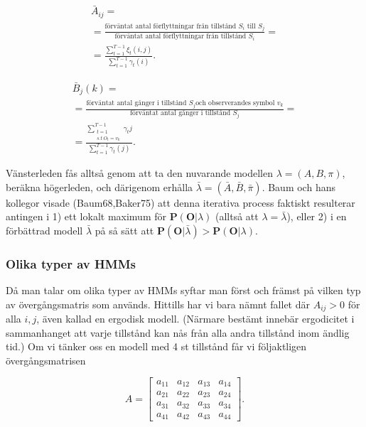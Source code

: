 \documentclass[../rapport_MVEX01-11-05]{subfiles}
\begin{document}
\begin{multline*}
\bar{A}_{ij} = \\ = \frac{\text{förväntat antal förflyttningar från
    tillstånd $S_i$ till $S_j$}}{\text{förväntat antal förflyttningar
    från tillstånd $S_i$}} = \\ =
\frac{\sum_{t=1}^{T-1}\xi_t(i,j)}{\sum_{t=1}^{T-1}\gamma_t(i)}.
\end{multline*}

\begin{multline*}
\bar{B}_j(k) = \\ = \frac{\text{förväntat antal gånger i tillstånd $S_j$
    och observerandes symbol $v_k$}}{\text{förväntat antal gånger i
    tillstånd $S_j$}} = \\ = \frac{\sum_{\substack{t=1\\s.t~ O_t =
      v_k}}^{T-1}\gamma_t{j}}{\sum_{t=1}^{T-1}\gamma_t(j)}.
\end{multline*}

Vänsterleden fås alltså genom att ta den nuvarande modellen $\lambda =
(A,B,\pi)$, beräkna högerleden, och därigenom erhålla $\bar{\lambda} =
(\bar{A},\bar{B}, \bar{\pi})$. Baum och hans kollegor visade
(Baum68,Baker75) att denna iterativa process faktiskt resulterar
antingen i 1) ett lokalt maximum för $\textbf{P}(\textbf{O}|\lambda)$
(alltså att $\lambda = \bar{\lambda}$), eller 2) i en förbättrad
modell $\bar{\lambda}$ på så sätt att
$\textbf{P}(\textbf{O}|\bar{\lambda}) > \textbf{P}(\textbf{O}|\lambda)$. 

\subsubsection{Olika typer av HMMs}

Då man talar om olika typer av HMMs syftar man först och främst på
vilken typ av övergångsmatris som används. Hittills har vi bara nämnt
fallet där $A_{ij} > 0$ för alla $i,j$, även kallad en ergodisk
modell. (Närmare bestämt innebär ergodicitet i sammanhanget att varje
tillstånd kan nås från alla andra tillstånd inom ändlig tid.) Om vi
tänker oss en modell med 4 st tillstånd får vi följaktligen övergångsmatrisen

\begin{equation*}
A = \begin{bmatrix}
a_{11} & a_{12} & a_{13} & a_{14}\\
a_{21} & a_{22} & a_{23} & a_{24}\\
a_{31} & a_{32} & a_{33} & a_{34}\\
a_{41} & a_{42} & a_{43} & a_{44}\end{bmatrix}.  
\end{equation*} 
\end{document}
